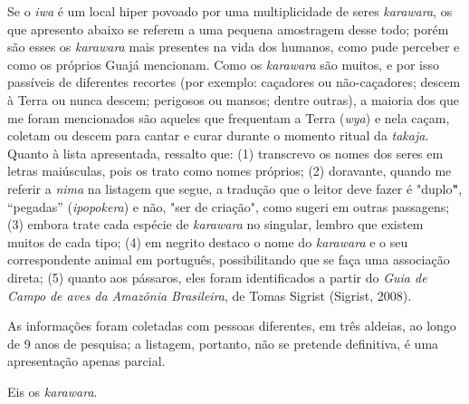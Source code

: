 Se o \emph{iwa} é um local hiper povoado por uma multiplicidade de seres
\emph{karawara}, os que apresento abaixo se referem a uma pequena
amostragem desse todo; porém são esses os \emph{karawara} mais presentes
na vida dos humanos, como pude perceber e como os próprios Guajá
mencionam. Como os \emph{karawara} são muitos, e por isso passíveis de
diferentes recortes (por exemplo: caçadores ou não-caçadores; descem à
Terra ou nunca descem; perigosos ou mansos; dentre outras), a maioria
dos que me foram mencionados são aqueles que frequentam a Terra
(\emph{wya}) e nela caçam, coletam ou descem para cantar e curar durante
o momento ritual da \emph{takaja}. Quanto à lista apresentada, ressalto
que: (1) transcrevo os nomes dos seres em letras maiúsculas, pois os
trato como nomes próprios; (2) doravante, quando me referir a
\emph{nima} na listagem que segue, a tradução que o leitor deve fazer é
"duplo\textbf{"}, ``pegadas'' (\emph{ipopokera}) e não, "ser de
criação", como sugeri em outras passagens; (3) embora trate cada espécie
de \emph{karawara} no singular, lembro que existem muitos de cada tipo;
(4) em negrito destaco o nome do \emph{karawara} e o seu correspondente
animal em português, possibilitando que se faça uma associação direta;
(5) quanto aos pássaros, eles foram identificados a partir do \emph{Guia
de Campo} \emph{de aves da Amazônia Brasileira}, de Tomas Sigrist
(Sigrist, 2008).

As informações foram coletadas com pessoas diferentes, em três aldeias,
ao longo de 9 anos de pesquisa; a listagem, portanto, não se pretende
definitiva, é uma apresentação apenas parcial.

Eis os \emph{karawara}.

